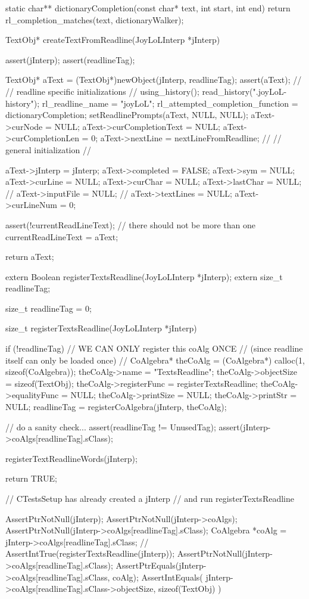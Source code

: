 static char** dictionaryCompletion(const char* text, int start, int end) {
 return rl_completion_matches(text, dictionaryWalker);
}
\stopCCode

\startCCode
TextObj* createTextFromReadline(JoyLoLInterp *jInterp) {
  assert(jInterp);
  assert(readlineTag);
  
  TextObj* aText = (TextObj*)newObject(jInterp, readlineTag);
  assert(aText);
  //
  // readline specific initializations
  //
  using_history();
  read_history(".joyLoL-history");
  rl_readline_name = "joyLoL";
  rl_attempted_completion_function = dictionaryCompletion;
  setReadlinePrompts(aText, NULL, NULL);
  aText->curNode = NULL;
  aText->curCompletionText = NULL;
  aText->curCompletionLen  = 0;
  aText->nextLine = nextLineFromReadline;
  //
  // general initialization
  //

  aText->jInterp    = jInterp;
  aText->completed  = FALSE;
  aText->sym        = NULL;
  aText->curLine    = NULL;
  aText->curChar    = NULL;
  aText->lastChar   = NULL;
  //
  aText->inputFile = NULL;
  //
  aText->textLines  = NULL;
  aText->curLineNum = 0;

  assert(!currentReadLineText); // there should not be more than one
  currentReadLineText = aText;

  return aText;
}
\stopCCode

\startTestSuite[registerTextsReadline]

\startCHeader
extern Boolean registerTextsReadline(JoyLoLInterp *jInterp);
extern size_t readlineTag;
\stopCHeader

\startCCode
size_t   readlineTag = 0;

size_t registerTextsReadline(JoyLoLInterp *jInterp) {
  if (!readlineTag) {
    // WE CAN ONLY register this coAlg ONCE
    // (since readline itself can only be loaded once)
    //
    CoAlgebra* theCoAlg    = (CoAlgebra*) calloc(1, sizeof(CoAlgebra));
    theCoAlg->name         = "TextsReadline";
    theCoAlg->objectSize   = sizeof(TextObj);
    theCoAlg->registerFunc = registerTextsReadline;
    theCoAlg->equalityFunc = NULL;
    theCoAlg->printSize    = NULL;
    theCoAlg->printStr     = NULL;
    readlineTag = registerCoAlgebra(jInterp, theCoAlg);
  }
  
  // do a sanity check...
  assert(readlineTag != UnusedTag);
  assert(jInterp->coAlgs[readlineTag].sClass);
  
  registerTextReadlineWords(jInterp);

  return TRUE;
}
\stopCCode


\startCTest
  // CTestsSetup has already created a jInterp
  // and run registerTextsReadline
  
  AssertPtrNotNull(jInterp);
  AssertPtrNotNull(jInterp->coAlgs);
  AssertPtrNotNull(jInterp->coAlgs[readlineTag].sClass);
  CoAlgebra *coAlg = jInterp->coAlgs[readlineTag].sClass;
//  AssertIntTrue(registerTextsReadline(jInterp));
  AssertPtrNotNull(jInterp->coAlgs[readlineTag].sClass);
  AssertPtrEquals(jInterp->coAlgs[readlineTag].sClass, coAlg);
  AssertIntEquals(
    jInterp->coAlgs[readlineTag].sClass->objectSize,
    sizeof(TextObj)
  )
\stopCTest
\stopTestCase
\stopTestSuite

